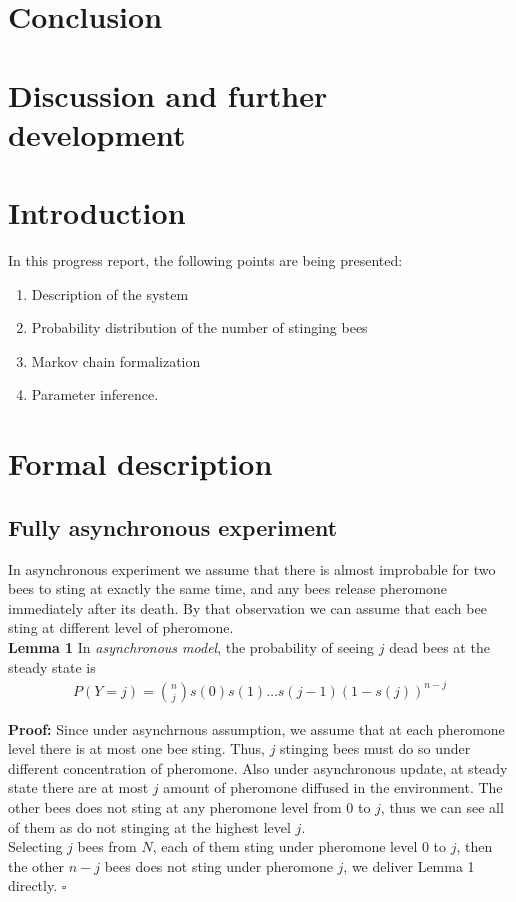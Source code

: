 \documentclass[12pt]{article}
\newcommand*{\QED}{\hfill\ensuremath{\square}}
\begin{document}
\section{Conclusion}










\section{Discussion and further development}



\section{Introduction}
In this progress report, the following points are being presented:
\begin{enumerate}
\item Description of the system
\item Probability distribution of the number of stinging bees
\item Markov chain formalization
\item Parameter inference.
\end{enumerate}

\section{Formal description}

\subsection{Fully asynchronous experiment}
In asynchronous experiment we assume that there is almost improbable for two
bees to sting at exactly the same time, and any bees release pheromone
immediately after its death. By that observation we can assume that each bee
sting at different level of pheromone.\\

\textbf{Lemma 1} In \textit{asynchronous model}, the probability of seeing $j$
dead bees at the steady state is
\begin{align}
  P(Y=j) = {n\choose j}s(0)s(1)\ldots s(j-1)(1 - s(j))^{n-j} 
\end{align}

\textbf{Proof:} Since under asynchrnous assumption, we assume that at each
pheromone level there is at most one bee sting. Thus, $j$ stinging bees must do
so under different concentration of pheromone. Also under asynchronous update,
at steady state there are at most $j$ amount of pheromone diffused in the
environment. The other bees does not sting at any pheromone level from $0$ to
$j$, thus we can see all of them as do not stinging at the highest level $j$.\\
Selecting $j$ bees from $N$, each of them sting under pheromone level $0$ to
$j$, then the other $n-j$ bees does not sting under pheromone $j$, we deliver
Lemma 1 directly. \QED
\end{document}

